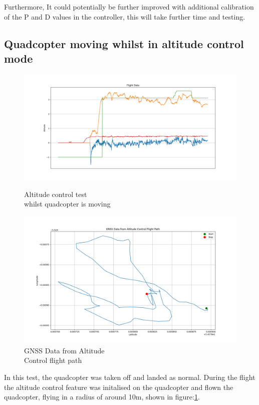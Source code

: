 \documentclass{article}
\begin{document}
Furthermore, It could potentially be further improved with additional
calibration of the P and D values in the controller, this will take further time
and testing. 


\subsection*{Quadcopter moving whilst in altitude control mode}
\begin{figure}[H]
  \begin{minipage}{0.5\textwidth}
    \centering
    \includegraphics[width=1\textwidth]{Pictures/Altitude_hold_test_moving.png}
    \captionsetup{justification=centering}
    \caption{Altitude control test \\ whilst quadcopter is moving}
    \label{fig:Altitude_hold_test_moving}
  \end{minipage}
  \begin{minipage}{0.5\textwidth}
    \centering
    \includegraphics[width=1\textwidth]{Pictures/GNSS_Altitude_hold_test_moving.png}
    \captionsetup{justification=centering}
    \caption{GNSS Data from Altitude \\ Control flight path}
    \label{fig:GNSS_Altitude_hold_test_moving}
  \end{minipage}
\end{figure}
In this test, the quadcopter was taken off and landed as normal. During the
flight the altitude control feature was initalised on the quadcopter and flown
the quadcopter, flying in a radius of around 10m, shown in
figure:\ref{fig:GNSS_Altitude_hold_test_moving}.
\end{document}
